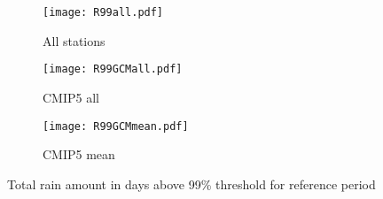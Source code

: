 \documentclass{article}
\begin{document}
	\begin{figure}[H]
		\centering
		\begin{subfigure}{0.5\textwidth}
			\centering
			\texttt{[image: R99all.pdf]}
			\caption{All stations}
		\end{subfigure}%
		\begin{subfigure}{0.5\textwidth}
			\centering
			\texttt{[image: R99GCMall.pdf]}
			\caption{CMIP5 all}
		\end{subfigure}
		\begin{subfigure}{0.5\textwidth}
			\centering
			\texttt{[image: R99GCMmean.pdf]}
			\caption{CMIP5 mean}
		\end{subfigure}
		\caption{Total rain amount in days above 99\% threshold for reference period}
		\label{R99}
	\end{figure}
\end{document}
